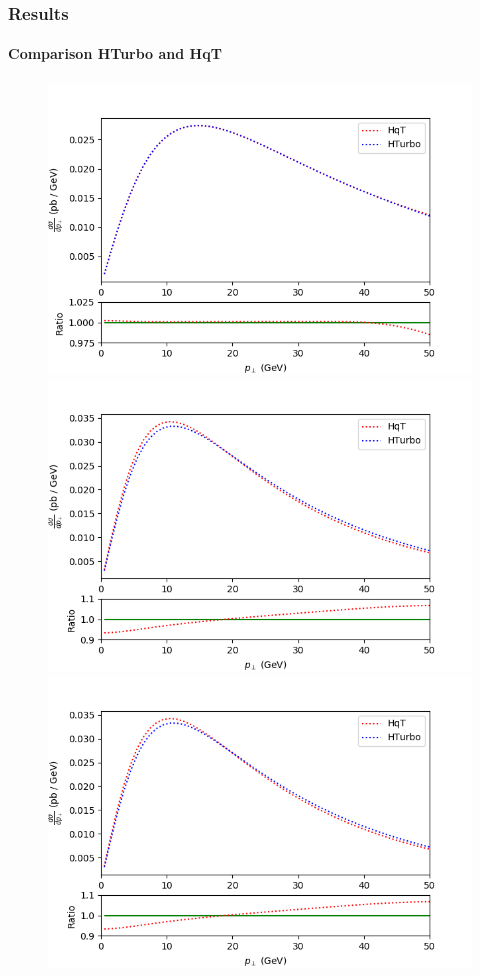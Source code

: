 \documentclass[aspectratio=43]{beamer}
\begin{document}
\begin{frame}

\frametitle{Results}
\framesubtitle{Comparison HTurbo and HqT}

\begin{figure}
	\includegraphics[width = \linewidth]{plots/hturbo_LL.png}
	\endminipage\hfill
	\includegraphics[width = \linewidth]{plots/hturbo_NLL.png}
	\endminipage\hfill
	\includegraphics[width = \linewidth]{plots/hturbo_NLL.png}
	\endminipage
\end{figure}


\end{frame}
\end{document}
